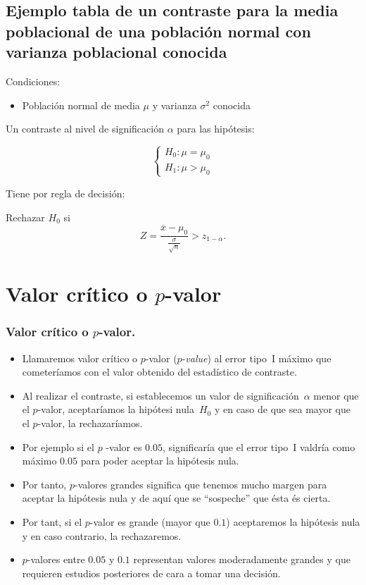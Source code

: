 \begin{frame}
    \section{Ejemplo tabla de un contraste para la media poblacional de una población
    normal con varianza poblacional conocida}

    Condiciones:
    \begin{itemize}
    \item Población normal de media $\mu$ y varianza $\sigma^2$
    conocida
    \end{itemize}

    Un contraste al nivel de significación $\alpha$ para las
    hipótesis:

   $$\left\{\begin{array}{l}
    H_{0}:\mu=\mu_{0}\\
    H_{1}:\mu>\mu_{0}
    \end{array}\right.$$


    Tiene por regla de decisión:

    Rechazar $H_{0}$ si
    $$Z=
    \frac{\overline{x}-\mu_{0}}{\frac{\sigma}{\sqrt{n}}}>z_{1-\alpha}.$$
\end{frame}

\section{Valor crítico o $p$-valor}

\begin{frame}
\frametitle{Valor crítico o $p$-valor.}
\begin{itemize}
\item Llamaremos valor crítico o  $p$-valor ($p$-\textsl{value}) al error tipo~I máximo que cometeríamos con el valor obtenido del estadístico de
contraste.

\item Al realizar el contraste, si establecemos un valor de significación~$\alpha$ menor que el $p$-valor, aceptaríamos la hipótesi nula~$H_0$ y en
caso de que sea mayor que el $p$-valor, la rechazaríamos.
\item 
Por ejemplo si el $p$ -valor es $0.05$, significaría que el error tipo~I valdría como máximo $0.05$ para poder aceptar la hipótesis nula.

\item 
Por tanto, $p$-valores grandes significa que tenemos mucho margen para aceptar la hipótesis nula y de aquí que se ``sospeche'' que ésta és cierta.

\item Por tant, si el $p$-valor es grande (mayor que $0.1$) aceptaremos la hipótesis nula y en caso contrario, la rechazaremos.

\item $p$-valores entre $0.05$ y $0.1$ representan valores moderadamente grandes y que requieren estudios posteriores de cara a tomar una decisión.
\end{itemize}
\end{frame}


